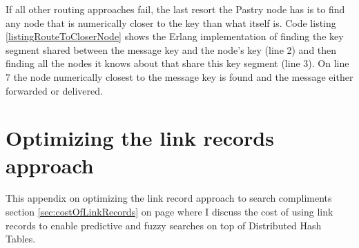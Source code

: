 

If all other routing approaches fail, the last resort the Pastry node has is to find any node that is numerically closer to the key than what itself is. Code listing \ref{listingRouteToCloserNode} shows the Erlang implementation of finding the key segment shared between the message key and the node's key (line 2) and then finding all the nodes it knows about that share this key segment (line 3). On line 7 the node numerically closest to the message key is found and the message either forwarded or delivered.




\chapter{Optimizing the link records approach}
\label{sec:appendixLinkRecords}
This appendix on optimizing the link record approach to search compliments section \ref{sec:costOfLinkRecords} on page \pageref{sec:costOfLinkRecords} where I discuss the cost of using link records to enable predictive and fuzzy searches on top of Distributed Hash Tables.

\mbox{}

